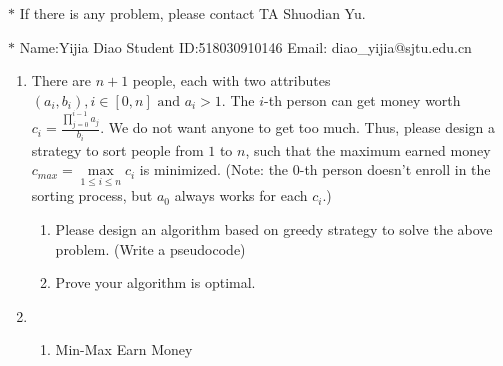 \documentclass[12pt,a4paper]{article}
\makeatletter
\newtheorem*{solution}{Solution}
\theoremstyle{definition}
\renewenvironment{solution}[1][Solution] {\par\pushQED{\qed}\normalfont\topsep6\p@\@plus6\p@\relax\trivlist\item[\hskip\labelsep\bfseries#1\@addpunct{.}]\ignorespaces}{\popQED\endtrivlist\@endpefalse} \makeatother
\makeatother
\begin{document}
\noindent

\noindent{}
\begin{center}
\footnotesize{\color{red}$*$ If there is any problem, please contact TA Shuodian Yu.}

\footnotesize{\color{blue}$*$ Name:Yijia Diao  \quad Student ID:518030910146 \quad Email: diao\_yijia@sjtu.edu.cn}
\end{center}

\begin{enumerate}
    \item
    There are $n+1$ people, each with two attributes $(a_i,b_i), i\in[0,n] \text{ and } a_i>1$. The $i$-th person can get money worth $c_i = \frac{\prod_{j=0}^{i-1}{a_j}}{b_i}$. We do not want anyone to get too much. Thus, please design a strategy to sort people from $1$ to $n$, such that the maximum earned money $c_{max}=\max\limits_{1\leq i\leq n} c_i$ is minimized. (Note: the 0-th person doesn't enroll in the sorting process, but $a_0$ always works for each $c_i$.)
    \begin{enumerate}
        \item Please design an algorithm based on greedy strategy to solve the above problem. (Write a pseudocode)
        \item Prove your algorithm is optimal.
    \end{enumerate}

    \begin{solution}\hspace*{\fill}
        \begin{enumerate}
        	\item
        	\begin{minipage}[t]{0.85\textwidth}
        		\begin{algorithm}[H]
        			\BlankLine
        			\caption{Min-Max Earn Money}
        			\label{Alg-MinmaxEarn}
        			
        		

\end{algorithm}
\end{minipage}
\end{enumerate}
\end{solution}
\end{enumerate}
\end{document}
